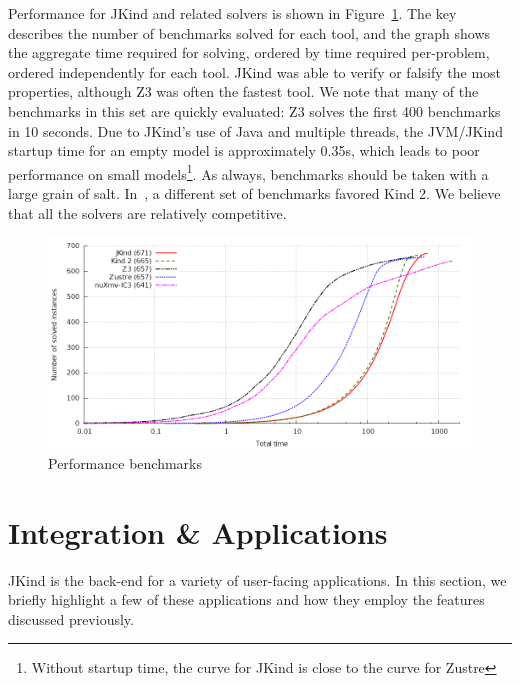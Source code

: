 \documentclass{llncs}
\newcommand{\jkind}{{\sc JKind}\xspace}
\newcommand{\kind}{{\sc Kind}\xspace}
\newcommand{\jkindapi}{{\sc JKindApi}\xspace}
\newcommand{\lustre}{{\sc Lustre}\xspace}
\newcommand{\zustre}{{\sc Zustre}\xspace}
\newcommand{\zthree}{{\sc Z3}\xspace}
\newcommand{\mike}[1]{\textcolor{red}{#1}}
\begin{document}
Performance for \jkind and related solvers is shown in
Figure~\ref{fig:benchmark}. The key describes the number of benchmarks
solved for each tool, and the graph shows the aggregate time required
for solving, ordered by time required per-problem, ordered
independently for each tool. \jkind was able to verify or falsify the
most properties, although \zthree was often the fastest tool.  We note
that many of the benchmarks in this set are quickly evaluated: \zthree
solves the first 400 benchmarks in 10 seconds.  Due to \jkind's use of
Java and multiple threads, the JVM/\jkind startup time for an empty
model is approximately 0.35s, which leads to poor performance on small
models\footnote{Without startup time, the curve for \jkind is close to
  the curve for \zustre}.  As always, benchmarks should be taken with
a large grain of salt.  In~\cite{champion2016cav}, a different set of
benchmarks favored \kind2.  We believe that all the solvers are
relatively competitive.


\begin{figure}
  \begin{center}
    \includegraphics[width=\textwidth]{graph.png}
  \end{center}
  \vspace{-2em}
  \caption{Performance benchmarks}
  \vspace{-1em}
  \label{fig:benchmark}
\end{figure}


\section{Integration \& Applications}


\jkind is the back-end for a variety of user-facing applications. In this section, we briefly highlight a few of these applications and how they employ the features discussed previously.
%
%
\end{document}
